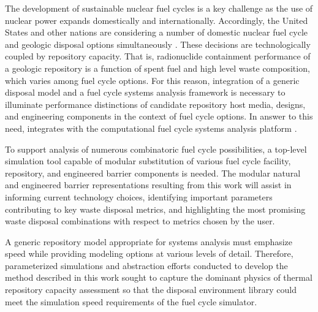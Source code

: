 
The development of sustainable nuclear fuel cycles is a key challenge as the 
use of nuclear power expands domestically and internationally.  Accordingly, 
the United States and other nations are considering a number of domestic nuclear fuel 
cycle and geologic disposal options simultaneously \cite{doe_strategy_2013, 
von_lensa_red-impact_2008}.  These decisions 
are technologically coupled by repository capacity. That is, 
radionuclide containment performance of a geologic repository is a function of 
spent fuel and high level waste composition, which varies among fuel cycle 
options. For this reason, integration of a generic disposal model and a fuel 
cycle systems analysis framework is necessary to illuminate performance 
distinctions of candidate repository host media, designs, and engineering 
components in the context of fuel cycle options.  In answer to this need, \Cyder 
integrates with the \Cyclus computational fuel cycle systems analysis platform 
\cite{huff_cyder_2013,wilson_cyclus:_2012}. 



To support analysis of numerous combinatoric fuel cycle possibilities, a 
top-level simulation tool capable of modular substitution of various fuel cycle 
facility, repository, and engineered barrier components is needed. The modular 
natural and engineered barrier representations resulting from this work will assist in 
informing current technology choices, identifying important parameters 
contributing to key waste disposal metrics, and highlighting the most promising 
waste disposal combinations with respect to metrics chosen by the user. 


A generic repository model appropriate for systems analysis must emphasize 
speed while providing modeling options at various levels of 
detail. Therefore, parameterized simulations and abstraction efforts conducted to develop 
the method described in this work sought to capture the dominant physics of 
thermal repository capacity assessment so that the \Cyder disposal environment 
library could meet the simulation speed requirements of the \Cyclus fuel cycle 
simulator.


